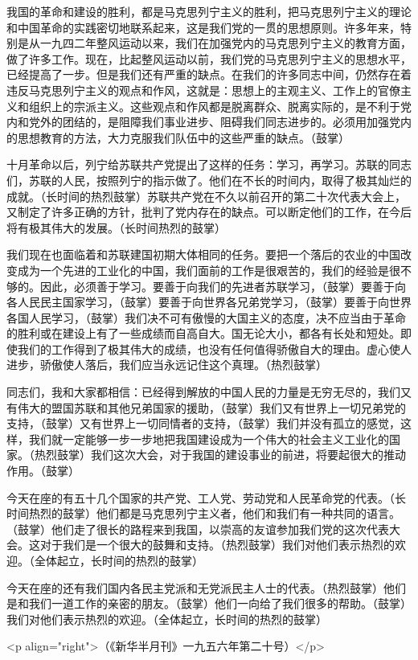 我国的革命和建设的胜利，都是马克思列宁主义的胜利，把马克思列宁主义的理论和中国革命的实践密切地联系起来，这是我们党的一贯的思想原则。许多年来，特别是从一九四二年整风运动以来，我们在加强党内的马克思列宁主义的教育方面，做了许多工作。现在，比起整风运动以前，我们党的马克思列宁主义的思想水平，已经提高了一步。但是我们还有严重的缺点。在我们的许多同志中间，仍然存在着违反马克思列宁主义的观点和作风，这就是：思想上的主观主义、工作上的官僚主义和组织上的宗派主义。这些观点和作风都是脱离群众、脱离实际的，是不利于党内和党外的团结的，是阻障我们事业进步、阻碍我们同志进步的。必须用加强党内的思想教育的方法，大力克服我们队伍中的这些严重的缺点。（鼓掌）

十月革命以后，列宁给苏联共产党提出了这样的任务：学习，再学习。苏联的同志们，苏联的人民，按照列宁的指示做了。他们在不长的时间内，取得了极其灿烂的成就。（长时间的热烈鼓掌）苏联共产党在不久以前召开的第二十次代表大会上，又制定了许多正确的方针，批判了党内存在的缺点。可以断定他们的工作，在今后将有极其伟大的发展。（长时间热烈的鼓掌）

我们现在也面临着和苏联建国初期大体相同的任务。要把一个落后的农业的中国改变成为一个先进的工业化的中国，我们面前的工作是很艰苦的，我们的经验是很不够的。因此，必须善于学习。要善于向我们的先进者苏联学习，（鼓掌）要善于向各人民民主国家学习，（鼓掌）要善于向世界各兄弟党学习，（鼓掌）要善于向世界各国人民学习，（鼓掌）我们决不可有傲慢的大国主义的态度，决不应当由于革命的胜利或在建设上有了一些成绩而自高自大。国无论大小，都各有长处和短处。即使我们的工作得到了极其伟大的成绩，也没有任何值得骄傲自大的理由。虚心使人进步，骄傲使人落后，我们应当永远记住这个真理。（热烈鼓掌）

同志们，我和大家都相信：已经得到解放的中国人民的力量是无穷无尽的，我们又有伟大的盟国苏联和其他兄弟国家的援助，（鼓掌）我们又有世界上一切兄弟党的支持，（鼓掌）又有世界上一切同情者的支持，（鼓掌）我们并没有孤立的感觉，这样，我们就一定能够一步一步地把我国建设成为一个伟大的社会主义工业化的国家。（热烈鼓掌）我们这次大会，对于我国的建设事业的前进，将要起很大的推动作用。（鼓掌）

今天在座的有五十几个国家的共产党、工人党、劳动党和人民革命党的代表。（长时间热烈的鼓掌）他们都是马克思列宁主义者，他们和我们有一种共同的语言。（鼓掌）他们走了很长的路程来到我国，以崇高的友谊参加我们党的这次代表大会。这对于我们是一个很大的鼓舞和支持。（热烈鼓掌）我们对他们表示热烈的欢迎。（全体起立，长时间的热烈的鼓掌）

今天在座的还有我们国内各民主党派和无党派民主人士的代表。（热烈鼓掌）他们是和我们一道工作的亲密的朋友。（鼓掌）他们一向给了我们很多的帮助。（鼓掌）我们对他们表示热烈的欢迎。（全体起立，长时间的热烈的鼓掌）

<p align="right">（《新华半月刊》一九五六年第二十号）</p>


